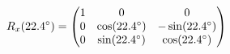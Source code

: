 \documentclass[preview]{standalone}
\begin{document}
\begin{align*}
\special{dvisvgm:raw <g id='unique000'>}R_x(22.4^\circ) = \begin{pmatrix} 1 & 0 & 0 \\ 0 & \cos(22.4^\circ) & -\sin(22.4^\circ) \\ 0 & \sin(22.4^\circ) & \cos(22.4^\circ) \end{pmatrix}\special{dvisvgm:raw </g>}
\end{align*}
\end{document}
